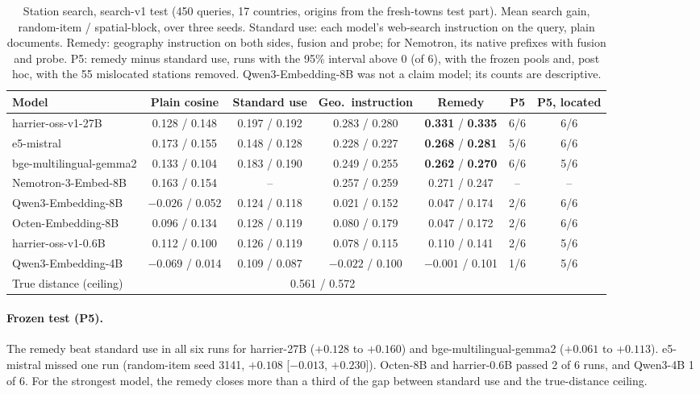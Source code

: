 \begin{table}[t]
\centering
\footnotesize
\setlength{\tabcolsep}{4pt}
\caption{Station search, search-v1 test (450 queries, 17 countries, origins from the fresh-towns test part). Mean search gain, random-item / spatial-block, over three seeds. Standard use: each model's web-search instruction on the query, plain documents. Remedy: geography instruction on both sides, fusion and probe; for Nemotron, its native prefixes with fusion and probe. P5: remedy minus standard use, runs with the 95\% interval above 0 (of 6), with the frozen pools and, post hoc, with the 55 mislocated stations removed. Qwen3-Embedding-8B was not a claim model; its counts are descriptive.}
\label{tab:search}
\begin{tabular}{@{}lcccccc@{}}
\toprule
Model & Plain cosine & Standard use & Geo.\ instruction & Remedy & P5 & P5, located \\
\midrule
harrier-oss-v1-27B & 0.128 / 0.148 & 0.197 / 0.192 & 0.283 / 0.280 & \textbf{0.331} / \textbf{0.335} & 6/6 & 6/6 \\
e5-mistral & 0.173 / 0.155 & 0.148 / 0.128 & 0.228 / 0.227 & \textbf{0.268} / \textbf{0.281} & 5/6 & 6/6 \\
bge-multilingual-gemma2 & 0.133 / 0.104 & 0.183 / 0.190 & 0.249 / 0.255 & \textbf{0.262} / \textbf{0.270} & 6/6 & 5/6 \\
Nemotron-3-Embed-8B & 0.163 / 0.154 & -- & 0.257 / 0.259 & 0.271 / 0.247 & -- & -- \\
Qwen3-Embedding-8B & $-0.026$ / 0.052 & 0.124 / 0.118 & 0.021 / 0.152 & 0.047 / 0.174 & 2/6 & 6/6 \\
Octen-Embedding-8B & 0.096 / 0.134 & 0.128 / 0.119 & 0.080 / 0.179 & 0.047 / 0.172 & 2/6 & 6/6 \\
harrier-oss-v1-0.6B & 0.112 / 0.100 & 0.126 / 0.119 & 0.078 / 0.115 & 0.110 / 0.141 & 2/6 & 5/6 \\
Qwen3-Embedding-4B & $-0.069$ / 0.014 & 0.109 / 0.087 & $-0.022$ / 0.100 & $-0.001$ / 0.101 & 1/6 & 5/6 \\
\midrule
True distance (ceiling) & \multicolumn{4}{c}{0.561 / 0.572} & & \\
\bottomrule
\end{tabular}
\end{table}

\paragraph{Frozen test (P5).}
The remedy beat standard use in all six runs for harrier-27B ($+0.128$ to $+0.160$) and bge-multilingual-gemma2 ($+0.061$ to $+0.113$). e5-mistral missed one run (random-item seed 3141, $+0.108$ [$-0.013$, $+0.230$]). Octen-8B and harrier-0.6B passed 2 of 6 runs, and Qwen3-4B 1 of 6. For the strongest model, the remedy closes more than a third of the gap between standard use and the true-distance ceiling.

